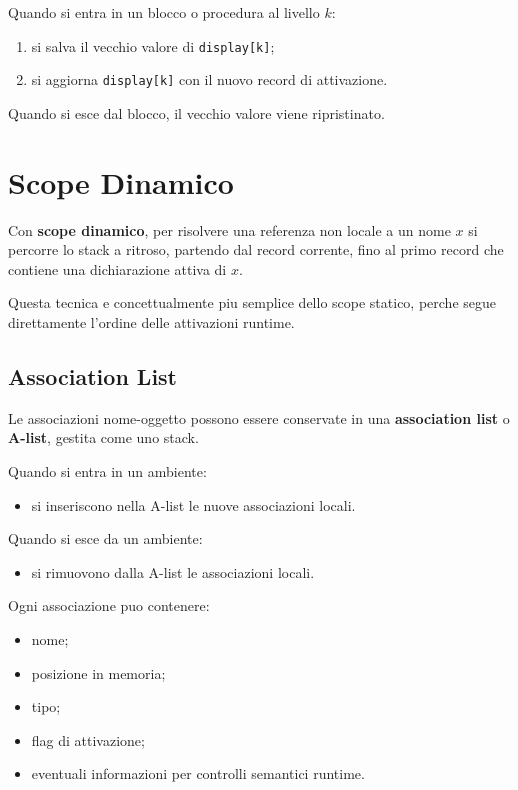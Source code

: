 \documentclass{article}
\begin{document}
Quando si entra in un blocco o procedura al livello $k$:

\begin{enumerate}
  \item si salva il vecchio valore di \texttt{display[k]};
  \item si aggiorna \texttt{display[k]} con il nuovo record di attivazione.
\end{enumerate}

Quando si esce dal blocco, il vecchio valore viene ripristinato.

\section{Scope Dinamico}

Con \textbf{scope dinamico}, per risolvere una referenza non locale a un nome $x$ si percorre lo stack a ritroso, partendo dal record corrente, fino al primo record che contiene una dichiarazione attiva di $x$.

Questa tecnica e concettualmente piu semplice dello scope statico, perche segue direttamente l'ordine delle attivazioni runtime.

\subsection{Association List}

Le associazioni nome-oggetto possono essere conservate in una \textbf{association list} o \textbf{A-list}, gestita come uno stack.

Quando si entra in un ambiente:

\begin{itemize}
  \item si inseriscono nella A-list le nuove associazioni locali.
\end{itemize}

Quando si esce da un ambiente:

\begin{itemize}
  \item si rimuovono dalla A-list le associazioni locali.
\end{itemize}

Ogni associazione puo contenere:

\begin{itemize}
  \item nome;
  \item posizione in memoria;
  \item tipo;
  \item flag di attivazione;
  \item eventuali informazioni per controlli semantici runtime.
\end{itemize}
\end{document}
